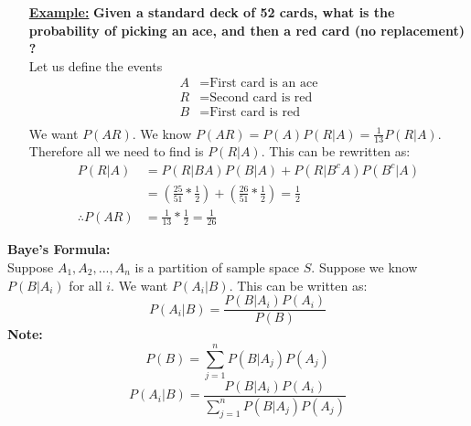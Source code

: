 \documentclass[10pt]{article}
\begin{document}
\begin{flushleft}
   \begin{itemize}
\item[\textbf{\underline{Example:}}] \textbf{Given a standard deck of 52 cards,
    what is the probability of picking an ace, and then a red card (no
replacement) ?} \\
Let us define the events
        $$ \begin{aligned}
            A &= \text{First card is an ace} \\
            R &= \text{Second card is red}\\
            B &= \text{First card is red}\\
        \end{aligned} $$
        We want $P(AR)$. We know $P(AR) = P(A)P(R|A) = \frac{1}{13}P(R|A)$.
        Therefore all we need to find is $P(R|A)$. This can be rewritten as:
        $$ \begin{aligned}
            P(R|A) &= P(R|BA)P(B|A) + P(R|B^cA)P(B^c|A) \\
                   &= (\frac{25}{51} * \frac{1}{2}) + (\frac{26}{51} *
                   \frac{1}{2}) = \frac{1}{2} \\
            \therefore P(AR) &= \frac{1}{13} * \frac{1}{2} = \frac{1}{26}
        \end{aligned}$$

   \end{itemize}


   \textbf{Baye's Formula:} \\
   Suppose $A_1, A_2, ... , A_n$ is a partition of sample space $S$. Suppose we
   know $P(B|A_i)$ for all $i$. We want $P(A_i|B)$. This can be written as:
   $$ P(A_i|B) = \frac{P(B|A_i)P(A_i)}{P(B)} $$
   \textbf{Note:}
   $$ P(B) = \sum_{j = 1}^{n}P(B|A_j)P(A_j) $$
   $$ \boxed{
       P(A_i|B) = \frac{P(B|A_i)P(A_i)}{\sum_{j = 1}^{n}P(B|A_j)P(A_j)}
   }$$


\end{flushleft}
\end{document}
